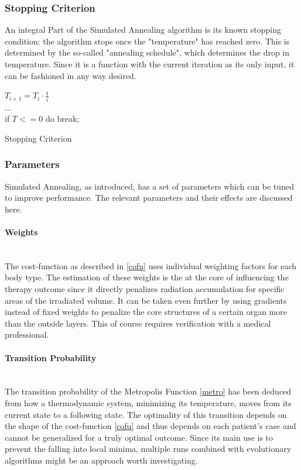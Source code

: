 \documentclass[12pt]{article}
\begin{document}
\subsubsection{Stopping Criterion}
\label{subsubsec: SAstopcrit}	
An integral Part of the Simulated Annealing algorithm is its known stopping condition: the algorithm stops once the "temperature" has reached zero. This is determined by the so-called "annealing schedule", which determines the drop in temperature. Since it is a function with the current iteration as its only input, it can be fashioned in any way desired. \\

\begin{algorithm}[H]
	$T_{i+1} = T_{i} \cdot \frac{1}{i}$~\\
	$...$ ~\\
	if $T<=0$ do break;
	 
\caption{Stopping Criterion}
\end{algorithm}  

\newpage
\subsubsection{Parameters}
Simulated Annealing, as introduced, has a set of parameters which can be tuned to improve performance. The relevant parameters and their effects are discussed here.

\paragraph{Weights}~\\
The cost-function as described in \ref{cofu} uses individual weighting factors for each body type.  The estimation of these weights is the at the core of influencing the therapy outcome since it directly penalizes radiation accumulation for specific areas of the irradiated volume. It can be taken even further by using gradients instead of fixed weights to penalize the core structures of a certain organ more than the outside layers. This of course requires verification with a medical professional.

\paragraph{Transition Probability} ~\\ 
The transition probability of the Metropolis Function \ref{metro} has been deduced from how a thermodynamic system, minimizing its temperature, moves from its current state to a following state. The optimality of this transition depends on the shape of the cost-function \ref{cofu} and thus depends on each patient's case and cannot be generalized for a truly optimal outcome. Since its main use is to prevent the falling into local minima, multiple runs combined with evolutionary algorithms might be an approach worth investigating.
\end{document}
